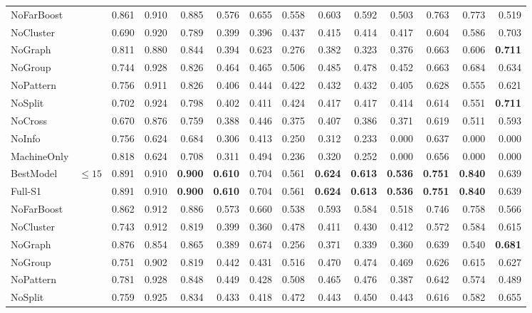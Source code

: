 \documentclass[9pt,a4paper,twocolumn]{extarticle}
\begin{document}
\begin{table}[tp]
\begin{tabular}{llrrrrrrrrrrrr}
NoFarBoost &  & 0.861 & 0.910 & 0.885 & 0.576 & 0.655 & 0.558 & 0.603 & 0.592 & 0.503 & 0.763 & 0.773 & 0.519 \\
NoCluster &  & 0.690 & 0.920 & 0.789 & 0.399 & 0.396 & 0.437 & 0.415 & 0.414 & 0.417 & 0.604 & 0.586 & 0.703 \\
NoGraph &  & 0.811 & 0.880 & 0.844 & 0.394 & 0.623 & 0.276 & 0.382 & 0.323 & 0.376 & 0.663 & 0.606 & \textbf{0.711} \\
NoGroup &  & 0.744 & 0.928 & 0.826 & 0.464 & 0.465 & 0.506 & 0.485 & 0.478 & 0.452 & 0.663 & 0.684 & 0.634 \\
NoPattern &  & 0.756 & 0.911 & 0.826 & 0.406 & 0.444 & 0.422 & 0.432 & 0.432 & 0.405 & 0.628 & 0.555 & 0.621 \\
NoSplit &  & 0.702 & 0.924 & 0.798 & 0.402 & 0.411 & 0.424 & 0.417 & 0.417 & 0.414 & 0.614 & 0.551 & \textbf{0.711} \\
NoCross &  & 0.670 & 0.876 & 0.759 & 0.388 & 0.446 & 0.375 & 0.407 & 0.386 & 0.371 & 0.619 & 0.511 & 0.593 \\
NoInfo &  & 0.756 & 0.624 & 0.684 & 0.306 & 0.413 & 0.250 & 0.312 & 0.233 & 0.000 & 0.637 & 0.000 & 0.000 \\
MachineOnly &  & 0.818 & 0.624 & 0.708 & 0.311 & 0.494 & 0.236 & 0.320 & 0.252 & 0.000 & 0.656 & 0.000 & 0.000 \\
\midrule
BestModel & $\le 15$ & 0.891 & 0.910 & \textbf{0.900} & \textbf{0.610} & 0.704 & 0.561 & \textbf{0.624} & \textbf{0.613} & \textbf{0.536} & \textbf{0.751} & \textbf{0.840} & 0.639 \\
Full-S1 &  & 0.891 & 0.910 & \textbf{0.900} & \textbf{0.610} & 0.704 & 0.561 & \textbf{0.624} & \textbf{0.613} & \textbf{0.536} & \textbf{0.751} & \textbf{0.840} & 0.639 \\
NoFarBoost &  & 0.862 & 0.912 & 0.886 & 0.573 & 0.660 & 0.538 & 0.593 & 0.584 & 0.518 & 0.746 & 0.758 & 0.566 \\
NoCluster &  & 0.743 & 0.912 & 0.819 & 0.399 & 0.360 & 0.478 & 0.411 & 0.430 & 0.412 & 0.572 & 0.584 & 0.615 \\
NoGraph &  & 0.876 & 0.854 & 0.865 & 0.389 & 0.674 & 0.256 & 0.371 & 0.339 & 0.360 & 0.639 & 0.540 & \textbf{0.681} \\
NoGroup &  & 0.751 & 0.902 & 0.819 & 0.442 & 0.431 & 0.516 & 0.470 & 0.474 & 0.469 & 0.626 & 0.615 & 0.627 \\
NoPattern &  & 0.781 & 0.928 & 0.848 & 0.449 & 0.428 & 0.508 & 0.465 & 0.476 & 0.387 & 0.642 & 0.574 & 0.489 \\
NoSplit &  & 0.759 & 0.925 & 0.834 & 0.433 & 0.418 & 0.472 & 0.443 & 0.450 & 0.443 & 0.616 & 0.582 & 0.655 \\

\end{tabular}
\end{table}
\end{document}

